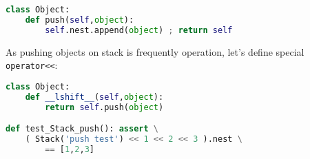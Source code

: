 \clearpage
\begin{lstlisting}[language=Python]
class Object:
	def push(self,object):
		self.nest.append(object) ; return self
\end{lstlisting}

\noindent As pushing objects on stack is frequently operation, let's define
special \verb|operator<<|:
\begin{lstlisting}[language=Python]
class Object:
	def __lshift__(self,object):
		return self.push(object)

def test_Stack_push(): assert \
	( Stack('push test') << 1 << 2 << 3 ).nest \
		== [1,2,3]
\end{lstlisting}
 
